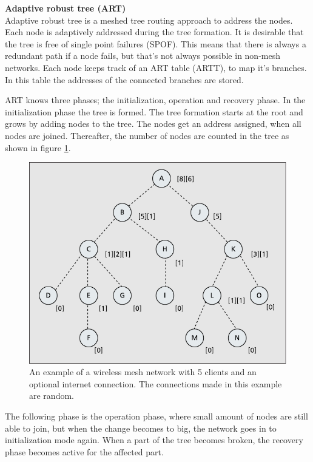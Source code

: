 \documentclass[10pt,a4paper]{article}
\begin{document}
\textbf{\large Adaptive robust tree (ART)}\\
Adaptive robust tree is a meshed tree routing approach to address the nodes. Each node is adaptively addressed during the tree formation. It is desirable that the tree is free of single point failures (SPOF). This means that there is always a redundant path if a node fails, but that's not always possible in non-mesh networks. Each node keeps track of an ART table (ARTT), to map it's branches. In this table the addresses of the connected branches are stored.

ART knows three phases; the initialization, operation and recovery phase. In the initialization phase the tree is formed. The tree formation starts at the root and grows by adding nodes to the tree. The nodes get an address assigned, when all nodes are joined. Thereafter, the number of nodes are counted in the tree as shown in figure \ref{fig:treenumbers}.

\begin{figure}[H]
   \centering
   \includegraphics[width=1\textwidth]{treenumbers}
   \caption{An example of a wireless mesh network with 5 clients and an optional internet connection. The connections made in this example are random.}
   \label{fig:treenumbers}
\end{figure}

The following phase is the operation phase, where small amount of nodes are still able to join, but when the change becomes to big, the network goes in to initialization mode again. When a part of the tree becomes broken, the recovery phase becomes active for the affected part.
\end{document}
